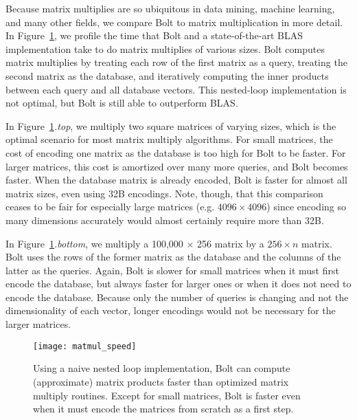 Because matrix multiplies are so ubiquitous in data mining, machine learning, and many other fields, we compare Bolt to matrix multiplication in more detail. In Figure~\ref{fig:matmul_speed}, we profile the time that Bolt and a state-of-the-art BLAS implementation \cite{eigen} take to do matrix multiplies of various sizes. Bolt computes matrix multiplies by treating each row of the first matrix as a query, treating the second matrix as the database, and iteratively computing the inner products between each query and all database vectors. This nested-loop implementation is not optimal, but Bolt is still able to outperform BLAS.

In Figure~\ref{fig:matmul_speed}\textit{.top}, we multiply two square matrices of varying sizes, which is the optimal scenario for most matrix multiply algorithms. For small matrices, the cost of encoding one matrix as the database is too high for Bolt to be faster. For larger matrices, this cost is amortized over many more queries, and Bolt becomes faster. When the database matrix is already encoded, Bolt is faster for almost all matrix sizes, even using 32B encodings. Note, though, that this comparison ceases to be fair for especially large matrices (e.g. $4096 \times 4096$) since encoding so many dimensions accurately would almost certainly require more than 32B.

In Figure~\ref{fig:matmul_speed}\textit{.bottom}, we multiply a 100,000 $\times$ 256 matrix by a $256 \times n$ matrix. Bolt uses the rows of the former matrix as the database and the columns of the latter as the queries. Again, Bolt is slower for small matrices when it must first encode the database, but always faster for larger ones or when it does not need to encode the database. Because only the number of queries is changing and not the dimensionality of each vector, longer encodings would not be necessary for the larger matrices.

\vspace{-2mm}
\begin{figure}[h]
\begin{center}
\texttt{[image: matmul\_speed]}
\vspace*{-3.5mm}
\caption{Using a naive nested loop implementation, Bolt can compute (approximate) matrix products faster than optimized matrix multiply routines. Except for small matrices, Bolt is faster even when it must encode the matrices from scratch as a first step.}
\label{fig:matmul_speed}
\end{center}
\end{figure}

